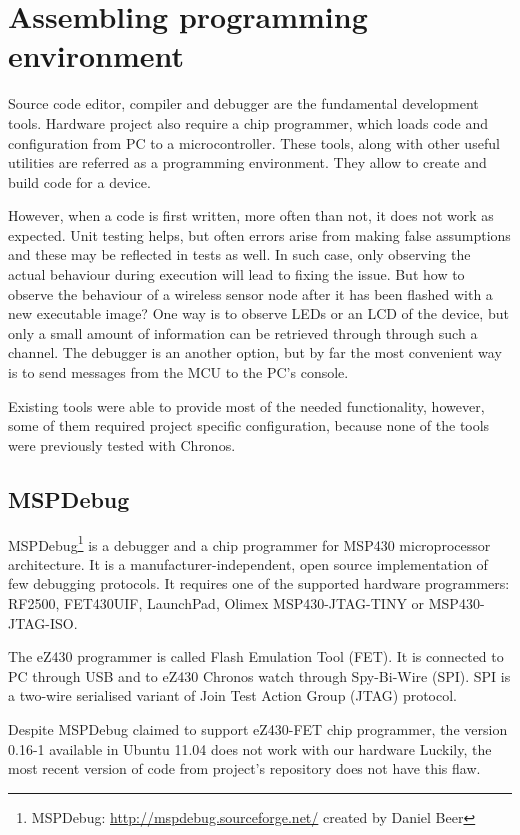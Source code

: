 \chapter{Assembling programming environment}
\label{ch:prog_env}

Source code editor, compiler and debugger are the fundamental development tools.  Hardware project also require a chip programmer, which loads code and configuration from PC to a microcontroller. These tools, along with other useful utilities are referred as a programming environment. They allow to create and build code for a device.

However, when a code is first written, more often than not, it does not work as expected. Unit testing helps, but often errors arise from making false assumptions and these may be reflected in tests as well. In such case, only observing the actual behaviour during execution will lead to fixing the issue. But how to observe the behaviour of a wireless sensor node after it has been flashed with a new executable image? One way is to observe LEDs or an LCD of the device, but only a small amount of information can be retrieved through through such a channel. The debugger is an another option, but by far the most convenient way is to send messages from the MCU to the PC's console.

Existing tools were able to provide most of the needed functionality, however, some of them required project specific configuration, because none of the tools were previously tested with Chronos.

\section{MSPDebug}

MSPDebug\footnote{MSPDebug: \url{http://mspdebug.sourceforge.net/} created by Daniel Beer} is a debugger and a chip programmer for MSP430 microprocessor architecture.
It is a manufacturer-independent, open source implementation of few debugging protocols.
It requires one of the supported hardware programmers: RF2500, FET430UIF, LaunchPad, Olimex MSP430-JTAG-TINY or MSP430-JTAG-ISO.

The eZ430 programmer is called Flash Emulation Tool (FET).
It is connected to PC through USB and to eZ430 Chronos watch through Spy-Bi-Wire (SPI). 
SPI is a two-wire serialised variant of Join Test Action Group (JTAG) protocol.

Despite MSPDebug claimed to support eZ430-FET chip programmer, the version 0.16-1 available in Ubuntu 11.04 does not work with our hardware Luckily, the most recent version of code from project's repository does not have this flaw.

